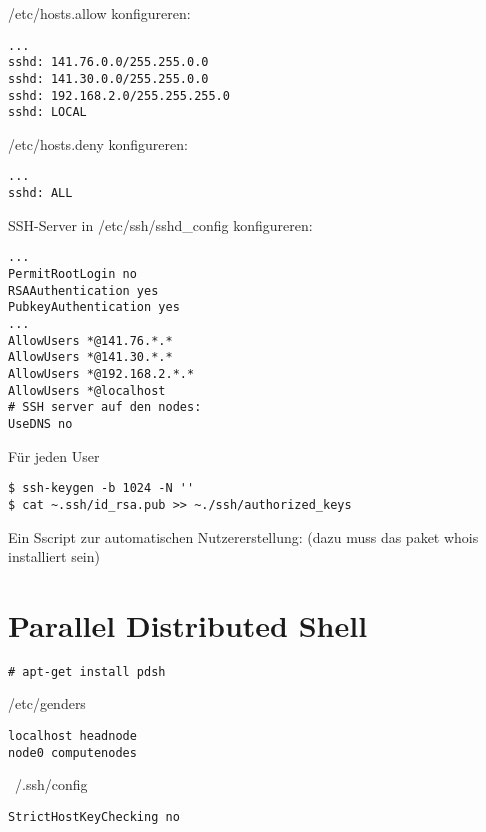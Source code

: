 /etc/hosts.allow konfigureren:
\begin{lstlisting}[style=Bash]
...
sshd: 141.76.0.0/255.255.0.0
sshd: 141.30.0.0/255.255.0.0
sshd: 192.168.2.0/255.255.255.0
sshd: LOCAL 
\end{lstlisting}
/etc/hosts.deny konfigureren:
\begin{lstlisting}[style=Bash]
...
sshd: ALL
\end{lstlisting}

SSH-Server in /etc/ssh/sshd\_config konfigureren:
\begin{lstlisting}[style=Bash]
...
PermitRootLogin no
RSAAuthentication yes
PubkeyAuthentication yes
...
AllowUsers *@141.76.*.*
AllowUsers *@141.30.*.*
AllowUsers *@192.168.2.*.*
AllowUsers *@localhost
# SSH server auf den nodes:
UseDNS no
\end{lstlisting}

Für jeden User
\begin{lstlisting}[style=Bash]
$ ssh-keygen -b 1024 -N ''
$ cat ~.ssh/id_rsa.pub >> ~./ssh/authorized_keys
\end{lstlisting}

Ein Sscript zur automatischen Nutzererstellung:
(dazu muss das paket whois installiert sein)


\section{Parallel Distributed Shell}
\begin{lstlisting}[style=Bash]
# apt-get install pdsh
\end{lstlisting}
/etc/genders
\begin{lstlisting}[style=Bash]
localhost headnode
node0 computenodes
\end{lstlisting}
~/.ssh/config
\begin{lstlisting}[style=Bash]
StrictHostKeyChecking no
\end{lstlisting}
